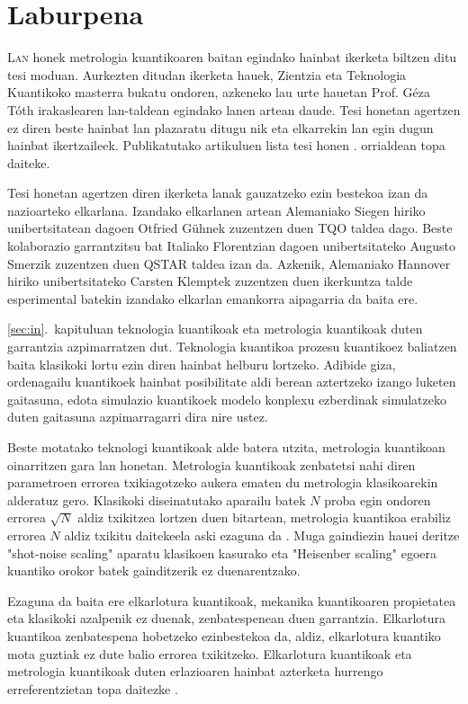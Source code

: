 \section*{Laburpena}
\label{sec:la}

\lettrine[lines=2, findent=3pt,nindent=0pt]{L}{an} honek metrologia kuantikoaren baitan egindako hainbat ikerketa biltzen ditu tesi moduan.
Aurkezten ditudan ikerketa hauek, Zientzia eta Teknologia Kuantikoko masterra bukatu ondoren, azkeneko lau urte hauetan Prof. Géza Tóth irakaslearen lan-taldean egindako lanen artean daude.
Tesi honetan agertzen ez diren beste hainbat lan plazaratu ditugu nik eta elkarrekin lan egin dugun hainbat ikertzaileek.
Publikatutako artikuluen lista tesi honen \pageref{sec:pu}. orrialdean topa daiteke.

Tesi honetan agertzen diren ikerketa lanak gauzatzeko ezin bestekoa izan da nazioarteko elkarlana.
Izandako elkarlanen artean Alemaniako Siegen hiriko unibertsitatean dagoen Otfried Gühnek zuzentzen duen TQO taldea dago.
Beste kolaborazio garrantzitsu bat Italiako Florentzian dagoen unibertsitateko Augusto Smerzik zuzentzen duen QSTAR taldea izan da.
Azkenik, Alemaniako Hannover hiriko unibertsitateko Carsten Klemptek zuzentzen duen ikerkuntza talde esperimental batekin izandako elkarlan emankorra aipagarria da baita ere.

\ref{sec:in}.~kapituluan teknologia kuantikoak eta metrologia kuantikoak duten garrantzia azpimarratzen dut.
Teknologia kuantikoa prozesu kuantikoez baliatzen baita klasikoki lortu ezin diren hainbat helburu lortzeko.
Adibide giza, ordenagailu kuantikoek hainbat posibilitate aldi berean aztertzeko izango luketen gaitasuna, edota simulazio kuantikoek modelo konplexu ezberdinak simulatzeko duten gaitasuna azpimarragarri dira nire ustez.

Beste motatako teknologi kuantikoak alde batera utzita, metrologia kuantikoan oinarritzen gara lan honetan.
Metrologia kuantikoak zenbatetsi nahi diren parametroen errorea txikiagotzeko aukera ematen du metrologia klasikoarekin alderatuz gero.
Klasikoki diseinatutako aparailu batek $N$ proba egin ondoren errorea $\sqrt{N}$ aldiz txikitzea lortzen duen bitartean, metrologia kuantikoa erabiliz errorea $N$ aldiz txikitu daitekeela aski ezaguna da \cite{Giovannetti2004, Paris2009}.
Muga gaindiezin hauei deritze "shot-noise scaling" aparatu klasikoen kasurako eta "Heisenber scaling" egoera kuantiko orokor batek gainditzerik ez duenarentzako.

Ezaguna da baita ere elkarlotura kuantikoak, mekanika kuantikoaren propietatea eta klasikoki azalpenik ez duenak, zenbatespenean duen garrantzia.
Elkarlotura kuantikoa zenbatespena hobetzeko ezinbestekoa da, aldiz, elkarlotura kuantiko mota guztiak ez dute balio errorea txikitzeko.
Elkarlotura kuantikoak eta metrologia kuantikoak duten erlazioaren hainbat azterketa hurrengo erreferentzietan topa daitezke \cite{Pezze2009, Louchet-Chauvet2010, Appel2009, Riedel2010, Gross2010, Luecke2011, Strobel2014, Hyllus2010}.

